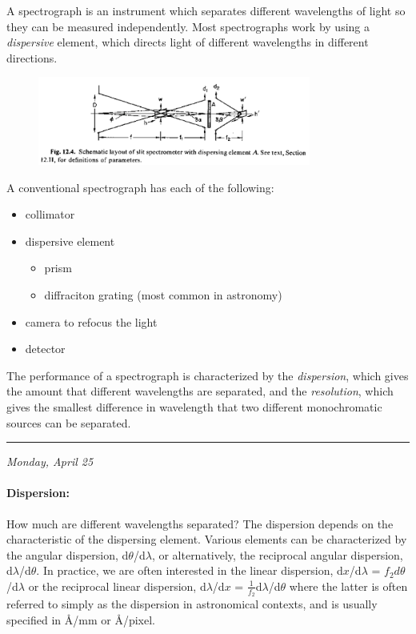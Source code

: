 \documentclass[12pt]{article}
\newcommand{\mynotes}[1]{\textcolor{myBlue}{#1}}
\newcommand{\mydate}[1]{
    \rule{\textwidth}{0.4pt}

    {\vspace{-1ex}\small\hfill\textit{#1}}}
\begin{document}
A spectrograph is an instrument which separates different wavelengths
of light so they can be measured independently. Most spectrographs
work by using a \textit{dispersive} element, which directs light of different
wavelengths in different directions.
\begin{figure}
    \centering
    \includegraphics[width=0.8\textwidth]{slit2.png}
\end{figure}
A conventional spectrograph has each of the following:
\begin{itemize}
    \item collimator
    \item dispersive element
        \begin{itemize}
            \item prism
            \item diffraciton grating (most common in astronomy)
        \end{itemize}
    \item camera to refocus the light
    \item detector
\end{itemize}
The performance of a spectrograph is characterized by the \textit{dispersion},
which gives the amount that different wavelengths are separated, and the
\textit{resolution}, which gives the smallest difference in wavelength that two
different monochromatic sources can be separated.

\mydate{Monday, April 25}

\paragraph{Dispersion:}
\mynotes{How much are different wavelengths separated?}
The dispersion depends on the characteristic of the dispersing element. Various
elements can be characterized by the angular dispersion, d$\theta$/d$\lambda$,
or alternatively, the reciprocal angular dispersion, d$\lambda$/d$\theta$. In
practice, we are often interested in the linear dispersion, d$x$/d$\lambda$ =
$f_{2}d\theta$/d$\lambda$ or the reciprocal linear dispersion, d$\lambda$/d$x$
= $\frac{1}{f_{2}}$d$\lambda$/d$\theta$ where the latter is often referred to
simply as the dispersion in astronomical contexts, and is usually specified in
\AA{}/mm or \AA{}/pixel.
\end{document}
